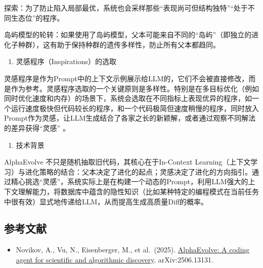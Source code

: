 探索：为了防止陷入局部最优，系统也会采样那些``表现尚可但结构独特''``处于不同生态位''的程序。

岛屿模型的轮转：如果使用了岛屿模型，父本可能来自不同的``岛屿''（即独立的进化子种群），这有助于保持种群的遗传多样性，防止所有父本都趋同。

\begin{enumerate}
\def\labelenumi{\arabic{enumi}.}
\setcounter{enumi}{1}
\tightlist
\item
  灵感程序（Inspirations）的选取
\end{enumerate}

灵感程序是作为Prompt中的上下文示例展示给LLM的，它们不会被直接修改，而是作为参考。灵感程序选取的一个关键原则是多样性。特别是在多目标优化（例如同时优化速度和内存）的场景下，系统会选取在不同指标上表现优异的程序，如一个运行速度极快但代码较长的程序，和一个代码极简但速度稍慢的程序，同时放入Prompt作为灵感，让LLM生成结合了各家之长的新颖解，或者通过观察不同解法的差异获得``灵感'' 。

\begin{enumerate}
\def\labelenumi{\arabic{enumi}.}
\setcounter{enumi}{2}
\tightlist
\item
  技术背景
\end{enumerate}

AlphaEvolve 不只是随机抽取旧代码，其核心在于In-Context Learning（上下文学习）与进化策略的结合：父本决定了进化的起点；灵感决定了进化的方向指引。通过精心挑选``灵感''，系统实际上是在构建一个动态的Prompt，利用LLM强大的上下文理解能力，将数据库中蕴含的隐性知识（比如某种特定的编程模式在当前任务中很有效）显式地传递给LLM，从而提高生成高质量Diff的概率。

\FloatBarrier
{}
\hypertarget{ux53c2ux8003ux6587ux732e-121}{%
\subsection{参考文献}\label{ux53c2ux8003ux6587ux732e-121}}

\vspace{0.25em}
\begin{itemize}
\tightlist
\item
  Novikov, A., Vu, N., Eisenberger, M., et al.~(2025). \href{https://arxiv.org/abs/2506.13131}{AlphaEvolve: A coding agent for scientific and algorithmic discovery}. arXiv:2506.13131.
\end{itemize}

\clearpage
